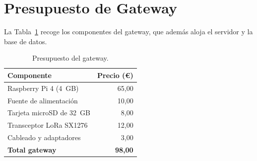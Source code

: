  

\section{Presupuesto de Gateway}

La Tabla~\ref{tab:presupuesto-gateway} recoge los componentes del gateway, que además aloja el servidor y la base de datos.

 
\begin{table}[H]
    \centering
    \caption{Presupuesto del gateway.}
    \label{tab:presupuesto-gateway}
    \renewcommand{\arraystretch}{1.2}
    \begin{tabularx}{0.6\textwidth}{X r}
        \toprule
        \textbf{Componente} & \textbf{Precio (\euro)} \\
        \midrule
        Raspberry Pi 4 (4~GB)            & 65,00 \\
        Fuente de alimentación           & 10,00 \\
        Tarjeta microSD de 32~GB         & 8,00  \\
        Transceptor LoRa SX1276          & 12,00 \\
        Cableado y adaptadores           & 3,00  \\
        \midrule
        \textbf{Total gateway} & \textbf{98,00} \\
        \bottomrule
    \end{tabularx}
\end{table}
 